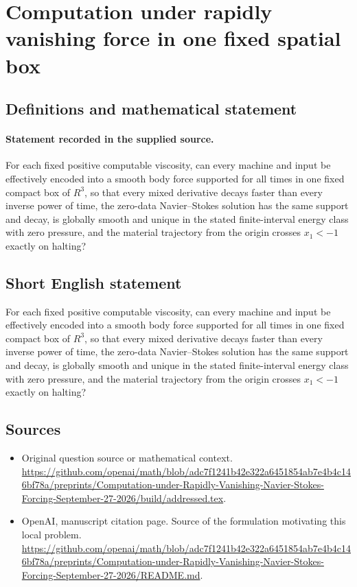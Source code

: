 \documentclass[11pt]{article}
\begin{document}
\section*{Computation under rapidly vanishing force in one fixed spatial box}\label{statement}
\subsection{Definitions and mathematical statement}
\paragraph{Statement recorded in the supplied source.}
For each fixed positive computable viscosity, can every machine and input be effectively encoded into a smooth body force supported for all times in one fixed compact box of $R^3$, so that every mixed derivative decays faster than every inverse power of time, the zero-data Navier–Stokes solution has the same support and decay, is globally smooth and unique in the stated finite-interval energy class with zero pressure, and the material trajectory from the origin crosses $x_1<-1$ exactly on halting?
\subsection{Short English statement}
For each fixed positive computable viscosity, can every machine and input be effectively encoded into a smooth body force supported for all times in one fixed compact box of $R^3$, so that every mixed derivative decays faster than every inverse power of time, the zero-data Navier–Stokes solution has the same support and decay, is globally smooth and unique in the stated finite-interval energy class with zero pressure, and the material trajectory from the origin crosses $x_1<-1$ exactly on halting?
\subsection{Sources}
\begin{itemize}
\item[S1] Original question source or mathematical context.
\url{https://github.com/openai/math/blob/adc7f1241b42e322a6451854ab7e4b4c146bf78a/preprints/Computation-under-Rapidly-Vanishing-Navier-Stokes-Forcing-September-27-2026/build/addressed.tex}.
\item[S2] OpenAI, manuscript citation page. Source of the formulation motivating this local problem.
\url{https://github.com/openai/math/blob/adc7f1241b42e322a6451854ab7e4b4c146bf78a/preprints/Computation-under-Rapidly-Vanishing-Navier-Stokes-Forcing-September-27-2026/README.md}.
\end{itemize}
\end{document}
